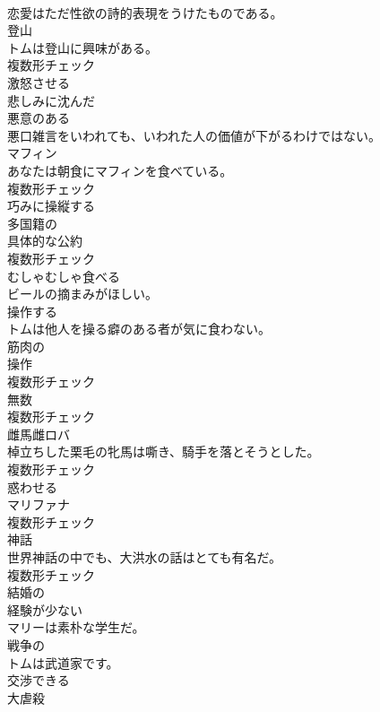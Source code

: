 \documentclass[8pt]{extreport}
\begin{document}
\begin{CJK}{UTF8}{min}
\\	恋愛はただ性欲の詩的表現をうけたものである。	
\\	[名詞]	登山	
\\	トムは登山に興味がある。	
\\	複数形チェック
\\	[動詞]	激怒させる	
\\	[形容詞]	悲しみに沈んだ	
\\	[形容詞]	悪意のある	
\\	悪口雑言をいわれても、いわれた人の価値が下がるわけではない。	
\\	[名詞]	マフィン	
\\	あなたは朝食にマフィンを食べている。	
\\	複数形チェック
\\	[動詞]	巧みに操縦する	
\\	[形容詞]	多国籍の	
\\	[名詞]	具体的な公約	
\\	複数形チェック
\\	[動詞]	むしゃむしゃ食べる	
\\	ビールの摘まみがほしい。	
\\	[動詞]	操作する	
\\	トムは他人を操る癖のある者が気に食わない。	
\\	[形容詞]	筋肉の	
\\	[名詞]	操作	
\\	複数形チェック
\\	[名詞]	無数	
\\	複数形チェック
\\	[名詞]	雌馬雌ロバ	
\\	棹立ちした栗毛の牝馬は嘶き、騎手を落とそうとした。	
\\	複数形チェック
\\	[動詞]	惑わせる	
\\	[名詞]	マリファナ	
\\	複数形チェック
\\	[名詞]	神話	
\\	世界神話の中でも、大洪水の話はとても有名だ。	
\\	複数形チェック
\\	[形容詞]	結婚の	
\\	[形容詞]	経験が少ない	
\\	マリーは素朴な学生だ。	
\\	[形容詞]	戦争の	
\\	トムは武道家です。	
\\	[形容詞]	交渉できる	
\\	[名詞]	大虐殺	

\end{CJK}
\end{document}

